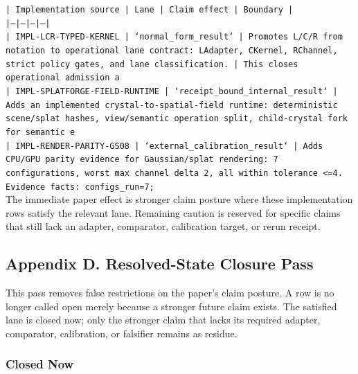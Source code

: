 \documentclass[11pt]{article}
\begin{document}
\noindent\texttt{| Implementation source | Lane | Claim effect | Boundary |}\\
\noindent\texttt{|---|---|---|---|}\\
\noindent\texttt{| IMPL-LCR-TYPED-KERNEL | `normal\_form\_result` | Promotes L/C/R from notation to operational lane contract: LAdapter, CKernel, RChannel, strict policy gates, and lane classification. | This closes operational admission a}\\
\noindent\texttt{| IMPL-SPLATFORGE-FIELD-RUNTIME | `receipt\_bound\_internal\_result` | Adds an implemented crystal-to-spatial-field runtime: deterministic scene/splat hashes, view/semantic operation split, child-crystal fork for semantic e}\\
\noindent\texttt{| IMPL-RENDER-PARITY-GS08 | `external\_calibration\_result` | Adds CPU/GPU parity evidence for Gaussian/splat rendering: 7 configurations, worst max channel delta 2, all within tolerance <=4. Evidence facts: configs\_run=7;}\\

The immediate paper effect is stronger claim posture where these implementation rows satisfy the relevant lane. Remaining caution is reserved for specific claims that still lack an adapter, comparator, calibration target, or rerun receipt.

\subsection*{Appendix D. Resolved-State Closure Pass}

This pass removes false restrictions on the paper's claim posture. A row is no longer called open merely because a stronger future claim exists. The satisfied lane is closed now; only the stronger claim that lacks its required adapter, comparator, calibration, or falsifier remains as residue.

\subsubsection*{Closed Now}
\end{document}

